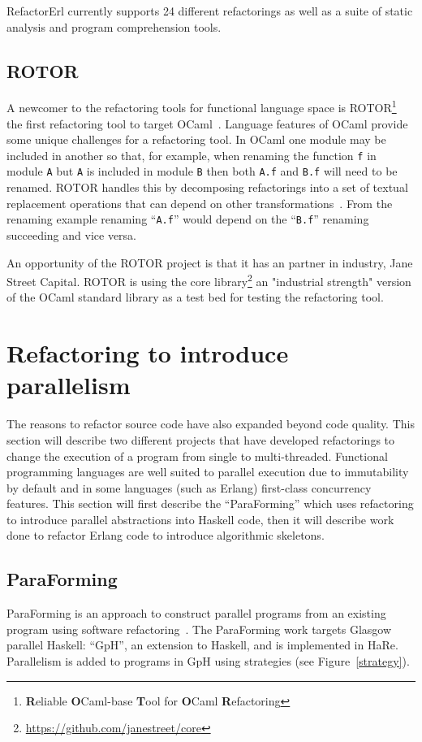 RefactorErl currently supports 24 different refactorings as well as a suite of static analysis and program comprehension tools. 

\subsection{ROTOR}

A newcomer to the refactoring tools for functional language space is ROTOR\footnote{\textbf{R}eliable \textbf{O}Caml-base \textbf{T}ool for \textbf{O}Caml \textbf{R}efactoring} the first refactoring tool to target OCaml~\citep{rotor}. Language features of OCaml provide some unique challenges for a refactoring tool. In OCaml one module may be included in another so that, for example, when renaming the function \texttt{f} in module \texttt{A} but \texttt{A} is included in module \texttt{B} then both \texttt{A.f} and \texttt{B.f} will need to be renamed. ROTOR handles this by decomposing refactorings into a set of textual replacement operations that can depend on other transformations~\citep{rotor}. From the renaming example renaming ``\texttt{A.f}'' would depend on the ``\texttt{B.f}'' renaming succeeding and vice versa.

An opportunity of the ROTOR project is that it has an partner in industry, Jane Street Capital. ROTOR is using the core library\footnote{\url{https://github.com/janestreet/core}} an "industrial strength" version of the OCaml standard library as a test bed for testing the refactoring tool.

\section{Refactoring to introduce parallelism}\label{refacParallel}

The reasons to refactor source code have also expanded beyond code quality. This section will describe two different projects that have developed refactorings to change the execution of a program from single to multi-threaded. Functional programming languages are well suited to parallel execution due to immutability by default and in some languages (such as Erlang) first-class concurrency features. This section will first describe the ``ParaForming'' which uses refactoring to introduce parallel abstractions into Haskell code, then it will describe work done to refactor Erlang code to introduce algorithmic skeletons.

\subsection{ParaForming}  
ParaForming is an approach to construct parallel programs from an existing program using software refactoring~\citep{paraforming}. The ParaForming work targets Glasgow parallel Haskell: ``GpH'', an extension to Haskell, and is implemented in HaRe. Parallelism is added to programs in GpH using strategies (see Figure~\ref{strategy}). 

